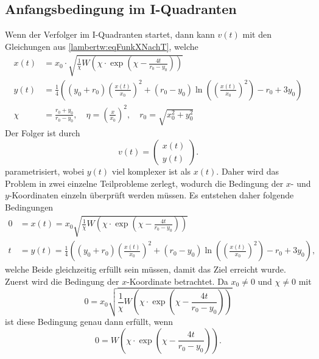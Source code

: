 \subsection{Anfangsbedingung im \RN{1}-Quadranten}
%
Wenn der Verfolger im \RN{1}-Quadranten startet, dann kann $v(t)$ mit den Gleichungen aus \eqref{lambertw:eqFunkXNachT}, welche
\begin{align*}
    x\left(t\right)
    &=
    x_0\cdot\sqrt{\frac{1}{\chi}W\left(\chi\cdot \exp\left( \chi-\frac{4t}{r_0-y_0}\right) \right)} \\
    y(t)
    &=
    \frac{1}{4}\left(\left(y_0+r_0\right)\left(\frac{x(t)}{x_0}\right)^2+\left(r_0-y_0\right)\operatorname{ln}\left(\left(\frac{x(t)}{x_0}\right)^2\right)-r_0+3y_0\right)\\
    \chi
    &=
    \frac{r_0+y_0}{r_0-y_0}, \quad
    \eta
    =
    \left(\frac{x}{x_0}\right)^2,\quad
    r_0
    =
    \sqrt{x_0^2+y_0^2}
\end{align*}
%
Der Folger ist durch
\begin{equation}
    v(t)
    =
    \left( \begin{array}{c} x(t) \\ y(t) \end{array} \right)
    \text{.}
\end{equation}
%
parametrisiert, wobei $y(t)$ viel komplexer ist als $x(t)$.
Daher wird das Problem in zwei einzelne Teilprobleme zerlegt, wodurch die Bedingung der $x$- und $y$-Koordinaten einzeln überprüft werden müssen. Es entstehen daher folgende Bedingungen
%
\begin{align*}
    0
    &=
    x(t)
    =
    x_0\sqrt{\frac{1}{\chi}W\left(\chi\cdot \exp\left( \chi-\frac{4t}{r_0-y_0}\right)\right)}
    \\
    t
    &=
    y(t)
    =
    \frac{1}{4}\left(\left(y_0+r_0\right)\left(\frac{x(t)}{x_0}\right)^2+\left(r_0-y_0\right)\operatorname{ln}\left(\left(\frac{x(t)}{x_0}\right)^2\right)-r_0+3y_0\right)\text{,}
\end{align*}
%
welche Beide gleichzeitig erfüllt sein müssen, damit das Ziel erreicht wurde.
Zuerst wird die Bedingung der $x$-Koordinate betrachtet.
Da $x_0 \neq 0$ und $\chi \neq 0$ mit
\begin{equation}
    0
    =
    x_0\sqrt{\frac{1}{\chi}W\left(\chi\cdot \exp\left( \chi-\frac{4t}{r_0-y_0}\right)\right)}
\end{equation}
ist diese Bedingung genau dann erfüllt, wenn
\begin{equation}
    0
    =
    W\left(\chi\cdot \exp\left( \chi-\frac{4t}{r_0-y_0}\right)\right)
    \text{.}
\end{equation}
